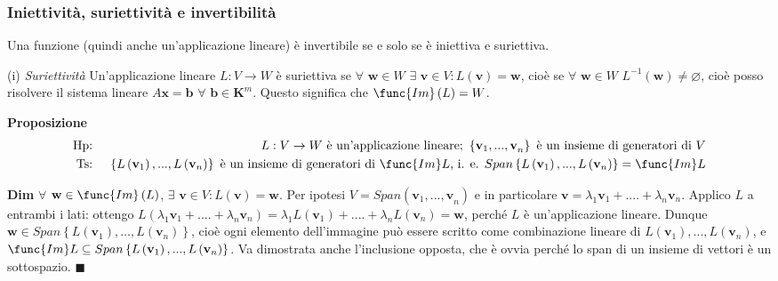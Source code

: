 \documentclass{article}
\begin{document}
\subsubsection{Iniettivit\`{a}, suriettivit\`{a} e invertibilit\`{a}}

Una funzione (quindi anche un'applicazione lineare) \`{e} invertibile se e
solo se \`{e} iniettiva e suriettiva.

(i) \emph{Suriettivit\`{a}} Un'applicazione lineare $L:V\rightarrow W$ \`{e}
suriettiva se $\forall $ $\mathbf{w}\in W$ $\exists $ $\mathbf{v}\in
V:L\left( \mathbf{v}\right) \mathbf{=w}$, cio\`{e} se $\forall $ $\mathbf{w}%
\in W$ $L^{-1}\left( \mathbf{w}\right) \neq \mathbf{\varnothing }$, cio\`{e}
posso risolvere il sistema lineare $A\mathbf{x=b}$ $\forall $ $\mathbf{b}\in 
\mathbf{K}^{m}$. Questo significa che $\func{Im}\left( L\right) =W$.

\textbf{Proposizione}%
\begin{eqnarray*}
\text{Hp}\text{: } &&L:V\rightarrow W\text{ \`{e} un'applicazione lineare; }%
\left\{ \mathbf{v}_{1}\mathbf{,...,v}_{n}\right\} \text{ \`{e} un insieme di
generatori di }V \\
\text{Ts}\text{: } &&\left\{ L\left( \mathbf{v}_{1}\right) ,...,L\left( 
\mathbf{v}_{n}\right) \right\} \text{ \`{e} un insieme di generatori di }%
\func{Im}L\text{, i. e. }Span\left\{ L\left( \mathbf{v}_{1}\right)
,...,L\left( \mathbf{v}_{n}\right) \right\} =\func{Im}L
\end{eqnarray*}

\textbf{Dim} $\forall $ $\mathbf{w}\in \func{Im}\left( L\right) $, $\exists $
$\mathbf{v}\in V:L\left( \mathbf{v}\right) =\mathbf{w}$. Per ipotesi $%
V=Span\left( \mathbf{v}_{1}\mathbf{,...,v}_{n}\right) $ e in particolare $%
\mathbf{v}=\lambda _{1}\mathbf{v}_{1}+....+\lambda _{n}\mathbf{v}_{n}$.
Applico $L$ a entrambi i lati: ottengo $L\left( \lambda _{1}\mathbf{v}%
_{1}+....+\lambda _{n}\mathbf{v}_{n}\right) =\lambda _{1}L\left( \mathbf{v}%
_{1}\right) +....+\lambda _{n}L\left( \mathbf{v}_{n}\right) =\mathbf{w}$,
perch\'{e} $L$ \`{e} un'applicazione lineare. Dunque $\mathbf{w}\in
Span\left\{ L\left( \mathbf{v}_{1}\right) ,...,L\left( \mathbf{v}_{n}\right)
\right\} $, cio\`{e} ogni elemento dell'immagine pu\`{o} essere scritto come
combinazione lineare di $L\left( \mathbf{v}_{1}\right) ,...,L\left( \mathbf{v%
}_{n}\right) $, e $\func{Im}L\subseteq Span\left\{ L\left( \mathbf{v}%
_{1}\right) ,...,L\left( \mathbf{v}_{n}\right) \right\} $. Va dimostrata
anche l'inclusione opposta, che \`{e} ovvia perch\'{e} lo span di un insieme
di vettori \`{e} un sottospazio. $\blacksquare $
\end{document}

